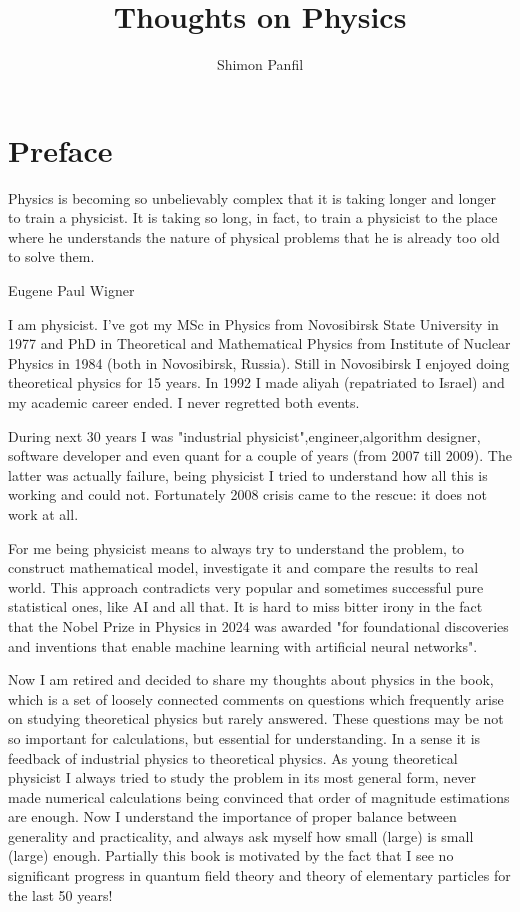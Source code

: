 \documentclass[russian,english]{book}
\title{Thoughts on Physics}
\author{Shimon Panfil}
\begin{document}
  

\maketitle

\frontmatter
\chapter{Preface}

\epigraph{Physics is becoming so unbelievably complex that it is taking longer
and longer to train a physicist. It is taking so long, in fact, to train a 
physicist to the place where he understands the nature of physical problems that 
he is already too old to solve them.}{Eugene Paul Wigner}

 I am physicist. I've got my MSc in Physics from Novosibirsk State University in 1977 
 and PhD in Theoretical and Mathematical Physics from Institute of Nuclear Physics 
 in 1984 (both in Novosibirsk, Russia). Still in Novosibirsk I enjoyed doing 
 theoretical physics for 15 years. In 1992 I made aliyah (repatriated to Israel)
 and my academic career ended. I never regretted both events.

During next 30 years I was "industrial physicist",engineer,algorithm designer, 
software developer and even quant for a couple of years (from 2007 till 2009).
The latter was actually failure, being physicist I tried to understand how all this
is working and could not. Fortunately 2008 crisis came to the rescue: it does not
work at all.

For me being physicist means to always try to understand the problem, to 
construct mathematical model, investigate it and compare the results to 
real world. This approach contradicts very popular and sometimes successful
pure statistical ones, like AI and all that. It is hard to miss bitter irony
in the fact that the Nobel Prize in Physics in 2024 was awarded "for foundational discoveries 
and inventions that enable machine learning with artificial neural networks".

Now I am retired and decided to share my thoughts about  physics
in the book, which is a set of loosely connected comments on questions 
which frequently arise on studying theoretical physics but rarely answered.
 These questions may be not so important for calculations, but essential for understanding.
 In a sense it is feedback of  industrial physics to theoretical physics. As young
 theoretical physicist I always tried to study the problem in its most general form,
 never made numerical calculations being convinced that order of magnitude
 estimations are enough. Now I understand the importance of proper balance between
 generality and practicality, and always ask myself how small (large) 
 is small (large) enough.
  Partially this book is motivated by the fact that I see no significant progress in 
 quantum field theory and theory of elementary particles for the last 50 years!  
\end{document}
